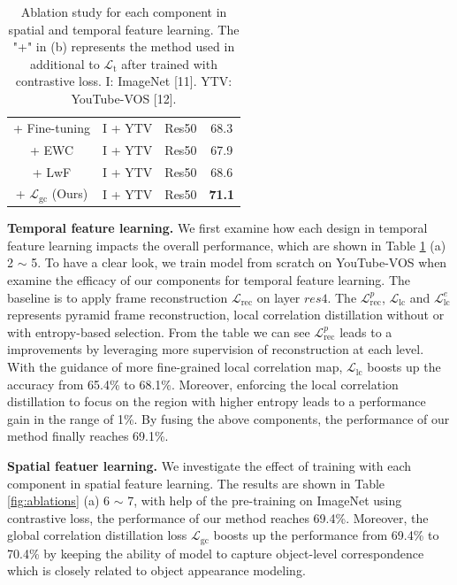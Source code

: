 \documentclass{article}
\begin{document}
\begin{table}[t]
{{\begin{tabular}{@{}cccc@{}}
            + Fine-tuning    & I + YTV & Res50 &68.3          \\
            + EWC            & I + YTV & Res50 &67.9          \\
            + LwF            & I + YTV & Res50 &68.6          \\
            + $\mathcal{L}_{\mathrm{gc}}$ (Ours) & I + YTV & Res50 &\textbf{71.1} \\ 
            \hline
            \end{tabular}%
            }
          }
    \captionsetup{font=small}
    \caption{Ablation study for each component in spatial and temporal feature learning.  The "+" in (b) represents the method used in additional to $\mathcal{L}_{\mathrm{t}}$ after trained with contrastive loss. I: ImageNet [11].  YTV: YouTube-VOS [12].}
    \label{tab:ablations}\vspace{-6mm}
\end{table}

\textbf{Temporal feature learning.} We first examine how each design in temporal feature learning impacts the overall performance, which are shown in Table \ref{tab:ablations} (a) 2 $\sim$ 5. To have a clear look, we train model from scratch on YouTube-VOS when examine the efficacy of our components for temporal feature learning. The baseline is to apply frame reconstruction $\mathcal{L}_{\mathrm{rec}}$ on layer $res4$. The $\mathcal{L}^{p}_{\mathrm{rec}}$, $\mathcal{L}_{\mathrm{lc}}$ and $\mathcal{L}^e_{\mathrm{lc}}$ represents pyramid frame reconstruction, local correlation distillation without or with entropy-based selection. From the table we can see $\mathcal{L}^{p}_{\mathrm{rec}}$ leads to a improvements by leveraging more supervision of reconstruction at each level.  With the guidance of more fine-grained local correlation map, $\mathcal{L}_{\mathrm{lc}}$ boosts up the accuracy from 65.4\% to 68.1\%.  Moreover, enforcing the local correlation distillation to focus on the region with higher entropy leads to a performance gain in the range of 1\%. By fusing the above components, the performance of our method finally reaches 69.1\%.

\textbf{Spatial featuer learning.} We investigate the effect of training with each component in spatial feature learning. The results are shown in Table \ref{fig:ablations} (a) 6 $\sim$ 7, with help of the pre-training on ImageNet using contrastive loss, the performance of our method reaches 69.4\%. Moreover, the global correlation distillation loss $\mathcal{L}_{\mathrm{gc}}$ boosts up the performance from 69.4\% to 70.4\% by keeping the ability of model to capture object-level correspondence which is closely related to object appearance modeling.
\end{document}
